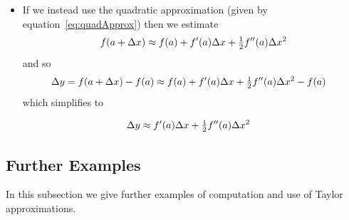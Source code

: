 \begin{eg}
\begin{itemize}
\item If we instead use the quadratic approximation (given by
equation~\eqref{eq:quadApprox}) then we estimate
\begin{align*}
f(a+\Delta x)\approx f(a)+f'(a)\Delta x+\tfrac{1}{2} f''(a)\Delta x^2
\end{align*}
and so
\begin{align*}
\Delta y&=f(a+\Delta x)-f(a) \approx f(a)+f'(a)\Delta x +\tfrac{1}{2} f''(a)\Delta x^2-f(a)
\end{align*}
which simplifies to
\begin{impeqn}\label{eq:quadDe}
\begin{align*}
  \Delta y &\approx f'(a)\Delta x+\tfrac{1}{2} f''(a)\Delta x^2
\end{align*}
\end{impeqn}
\end{itemize}

\end{eg}

\subsection{Further Examples}
In this subsection we give further examples of computation and use of Taylor
approximations.

